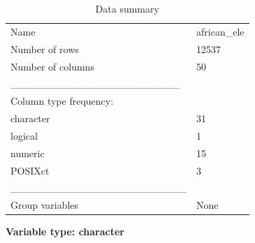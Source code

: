 \documentclass[
  letterpaper,
  DIV=11,
  numbers=noendperiod,
  oneside]{scrreprt}
\begin{document}
\begin{longtable}[]{@{}ll@{}}
\caption{Data summary}\tabularnewline
\toprule\noalign{}
\endfirsthead
\endhead
\bottomrule\noalign{}
\endlastfoot
Name & african\_ele \\
Number of rows & 12537 \\
Number of columns & 50 \\
\_\_\_\_\_\_\_\_\_\_\_\_\_\_\_\_\_\_\_\_\_\_\_ & \\
Column type frequency: & \\
character & 31 \\
logical & 1 \\
numeric & 15 \\
POSIXct & 3 \\
\_\_\_\_\_\_\_\_\_\_\_\_\_\_\_\_\_\_\_\_\_\_\_\_ & \\
Group variables & None \\
\end{longtable}

\textbf{Variable type: character}
\end{document}
